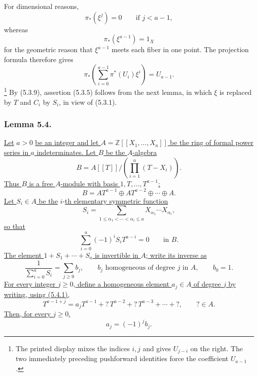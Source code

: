 For dimensional reasons,
\[
\pi_*(\xi^j)=0\qquad\text{if }j<a-1,
\]
whereas
\[
\pi_*(\xi^{a-1})=1_X
\]
for the geometric reason that $\xi^{a-1}$ meets each fiber in one
point.  The projection formula therefore gives
\begin{equation}\tag{5.3.9}
\pi_*\!\left(
\sum_{i=0}^{a-1}\pi^*(U_i)\xi^i
\right)=U_{a-1}.
\end{equation}
\footnote{The printed display mixes the indices $i,j$ and gives
$U_{j-i}$ on the right.  The two immediately preceding pushforward
identities force the coefficient $U_{a-1}$.}
By (5.3.9), assertion (5.3.5) follows from the next lemma, in which
$\xi$ is replaced by $T$ and $C_i$ by $S_i$, in view of (5.3.1).

\subsubsection*{Lemma 5.4.}
\underline{Let} $a>0$ \underline{be an integer and let
$A=\mathbb Z[[X_1,\ldots,X_a]]$ be the ring of formal power series in
$a$ indeterminates.  Let $B$ be the $A$-algebra}
\[
B=A[[T]]\bigg/\left(\prod_{i=1}^{a}(T-X_i)\right).
\]
\underline{Thus $B$ is a free $A$-module with basis
$1,T,\ldots,T^{a-1}$:}
\begin{equation}\tag{5.4.1}
B=AT^{a-1}\oplus AT^{a-2}\oplus\cdots\oplus A.
\end{equation}
\underline{Let $S_i\in A$ be the} $i$-\underline{th elementary symmetric
function}
\[
S_i=\sum_{1\leq\alpha_1<\cdots<\alpha_i\leq a}
X_{\alpha_1}\cdots X_{\alpha_i},
\]
\underline{so that}
\begin{equation}\tag{5.4.2}
\sum_{i=0}^{a}(-1)^iS_iT^{a-i}=0
\qquad\text{in }B.
\end{equation}
\underline{The element $1+S_1+\cdots+S_a$ is invertible in $A$;
write its inverse as}
\begin{equation}\tag{5.4.3}
\frac{1}{\sum_{i=0}^{a}S_i}
=\sum_{j\geq0}b_j,
\qquad
b_j\text{ homogeneous of degree }j\text{ in }A,
\qquad b_0=1.
\end{equation}
\underline{For every integer $j\geq0$, define a homogeneous element
$a_j\in A$ of degree $j$ by writing, using (5.4.1),}
\begin{equation}\tag{5.4.4}
T^{a-1+j}
=a_jT^{a-1}+{}?\,T^{a-2}+{}?\,T^{a-3}+\cdots+{}?,
\qquad ?\in A.
\end{equation}
\underline{Then, for every $j\geq0$,}
\begin{equation}\tag{5.4.5}
a_j=(-1)^jb_j.
\end{equation}

